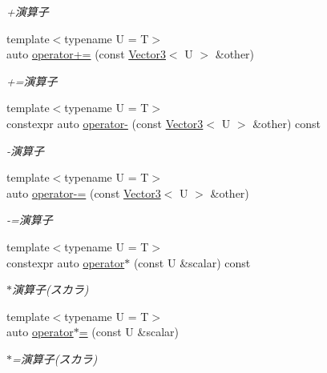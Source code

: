 \begin{DoxyCompactItemize}
\begin{DoxyCompactList}\small\item\em +演算子 \end{DoxyCompactList}\item 
{\footnotesize template$<$typename U  = T$>$ }\\auto \mbox{\hyperlink{classsaki_1_1_vector3_a99b24e43486d76b449b23239c80f70d7}{operator+=}} (const \mbox{\hyperlink{classsaki_1_1_vector3}{Vector3}}$<$ U $>$ \&other)
\begin{DoxyCompactList}\small\item\em +=演算子 \end{DoxyCompactList}\item 
{\footnotesize template$<$typename U  = T$>$ }\\constexpr auto \mbox{\hyperlink{classsaki_1_1_vector3_a9ff13b4e1114404b1b5391cd6aecb7c7}{operator-\/}} (const \mbox{\hyperlink{classsaki_1_1_vector3}{Vector3}}$<$ U $>$ \&other) const
\begin{DoxyCompactList}\small\item\em -\/演算子 \end{DoxyCompactList}\item 
{\footnotesize template$<$typename U  = T$>$ }\\auto \mbox{\hyperlink{classsaki_1_1_vector3_a3c15f413dc1c0aaef7311bd6dbb7224d}{operator-\/=}} (const \mbox{\hyperlink{classsaki_1_1_vector3}{Vector3}}$<$ U $>$ \&other)
\begin{DoxyCompactList}\small\item\em -\/=演算子 \end{DoxyCompactList}\item 
{\footnotesize template$<$typename U  = T$>$ }\\constexpr auto \mbox{\hyperlink{classsaki_1_1_vector3_a5136a5b7f840d84ecce85a760d17bf6f}{operator$\ast$}} (const U \&scalar) const
\begin{DoxyCompactList}\small\item\em $\ast$演算子(スカラ) \end{DoxyCompactList}\item 
{\footnotesize template$<$typename U  = T$>$ }\\auto \mbox{\hyperlink{classsaki_1_1_vector3_abcfc63ddcaa8c7f148debedbe7fca788}{operator$\ast$=}} (const U \&scalar)
\begin{DoxyCompactList}\small\item\em $\ast$=演算子(スカラ) \end{DoxyCompactList}\item 

\end{DoxyCompactItemize}
